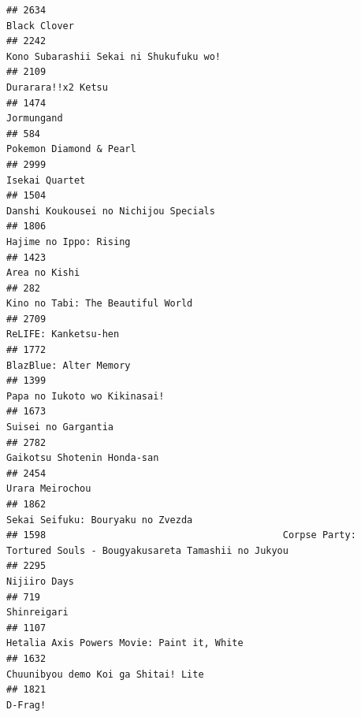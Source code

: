 \documentclass[
]{article}
\begin{document}
\begin{verbatim}
## 2634                                                                                              Black Clover
## 2242                                                                    Kono Subarashii Sekai ni Shukufuku wo!
## 2109                                                                                        Durarara!!x2 Ketsu
## 1474                                                                                                Jormungand
## 584                                                                                    Pokemon Diamond & Pearl
## 2999                                                                                            Isekai Quartet
## 1504                                                                     Danshi Koukousei no Nichijou Specials
## 1806                                                                                    Hajime no Ippo: Rising
## 1423                                                                                             Area no Kishi
## 282                                                                          Kino no Tabi: The Beautiful World
## 2709                                                                                      ReLIFE: Kanketsu-hen
## 1772                                                                                    BlazBlue: Alter Memory
## 1399                                                                              Papa no Iukoto wo Kikinasai!
## 1673                                                                                       Suisei no Gargantia
## 2782                                                                               Gaikotsu Shotenin Honda-san
## 2454                                                                                           Urara Meirochou
## 1862                                                                         Sekai Seifuku: Bouryaku no Zvezda
## 1598                                          Corpse Party: Tortured Souls - Bougyakusareta Tamashii no Jukyou
## 2295                                                                                              Nijiiro Days
## 719                                                                                                Shinreigari
## 1107                                                                Hetalia Axis Powers Movie: Paint it, White
## 1632                                                                       Chuunibyou demo Koi ga Shitai! Lite
## 1821                                                                                                   D-Frag!

\end{verbatim}
\end{document}
